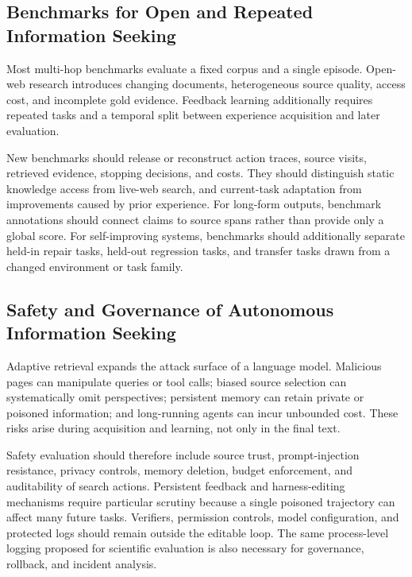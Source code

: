 \subsection{Benchmarks for Open and Repeated Information Seeking}
Most multi-hop benchmarks evaluate a fixed corpus and a single episode. Open-web research introduces changing documents, heterogeneous source quality, access cost, and incomplete gold evidence. Feedback learning additionally requires repeated tasks and a temporal split between experience acquisition and later evaluation.

New benchmarks should release or reconstruct action traces, source visits, retrieved evidence, stopping decisions, and costs. They should distinguish static knowledge access from live-web search, and current-task adaptation from improvements caused by prior experience. For long-form outputs, benchmark annotations should connect claims to source spans rather than provide only a global score. For self-improving systems, benchmarks should additionally separate held-in repair tasks, held-out regression tasks, and transfer tasks drawn from a changed environment or task family.

\subsection{Safety and Governance of Autonomous Information Seeking}
Adaptive retrieval expands the attack surface of a language model. Malicious pages can manipulate queries or tool calls; biased source selection can systematically omit perspectives; persistent memory can retain private or poisoned information; and long-running agents can incur unbounded cost. These risks arise during acquisition and learning, not only in the final text.

Safety evaluation should therefore include source trust, prompt-injection resistance, privacy controls, memory deletion, budget enforcement, and auditability of search actions. Persistent feedback and harness-editing mechanisms require particular scrutiny because a single poisoned trajectory can affect many future tasks. Verifiers, permission controls, model configuration, and protected logs should remain outside the editable loop. The same process-level logging proposed for scientific evaluation is also necessary for governance, rollback, and incident analysis.
